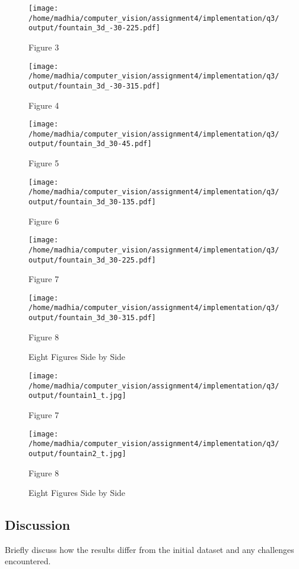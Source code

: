\documentclass{article}
\begin{document}
\begin{figure}[h!]
    \centering
    \begin{minipage}{0.4\textwidth}
        \centering
        \texttt{[image: /home/madhia/computer\_vision/assignment4/implementation/q3/output/fountain\_3d\_-30-225.pdf]}
        \caption{Figure 3}
    \end{minipage}%
    \begin{minipage}{0.4\textwidth}
        \centering
        \texttt{[image: /home/madhia/computer\_vision/assignment4/implementation/q3/output/fountain\_3d\_-30-315.pdf]}
        \caption{Figure 4}
    \end{minipage}%
\end{figure}
    
\begin{figure}[h!]
    \centering    
    \begin{minipage}{0.4\textwidth}
        \centering
        \texttt{[image: /home/madhia/computer\_vision/assignment4/implementation/q3/output/fountain\_3d\_30-45.pdf]}
        \caption{Figure 5}
    \end{minipage}%
    \begin{minipage}{0.4\textwidth}
        \centering
        \texttt{[image: /home/madhia/computer\_vision/assignment4/implementation/q3/output/fountain\_3d\_30-135.pdf]}
        \caption{Figure 6}
    \end{minipage}%
\end{figure}
    
\begin{figure}[h!]
    \centering    
    \begin{minipage}{0.4\textwidth}
        \centering
        \texttt{[image: /home/madhia/computer\_vision/assignment4/implementation/q3/output/fountain\_3d\_30-225.pdf]}
        \caption{Figure 7}
    \end{minipage}%
    \begin{minipage}{0.4\textwidth}
        \centering
        \texttt{[image: /home/madhia/computer\_vision/assignment4/implementation/q3/output/fountain\_3d\_30-315.pdf]}
        \caption{Figure 8}
    \end{minipage}
    \caption{Eight Figures Side by Side}
\end{figure}

\begin{figure}[h!]
    \centering    
    \begin{minipage}{0.4\textwidth}
        \centering
        \texttt{[image: /home/madhia/computer\_vision/assignment4/implementation/q3/output/fountain1\_t.jpg]}
        \caption{Figure 7}
    \end{minipage}%
    \begin{minipage}{0.4\textwidth}
        \centering
        \texttt{[image: /home/madhia/computer\_vision/assignment4/implementation/q3/output/fountain2\_t.jpg]}
        \caption{Figure 8}
    \end{minipage}
    \caption{Eight Figures Side by Side}
\end{figure}

\subsection{Discussion}
Briefly discuss how the results differ from the initial dataset and any challenges encountered.
\end{document}
